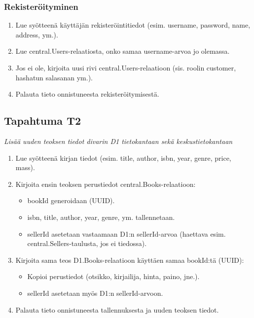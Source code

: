 \documentclass[11pt,a4paper]{article}
\begin{document}
\subsubsection{Rekisteröityminen}

\begin{enumerate}
	\item Lue syötteenä käyttäjän rekisteröintitiedot (esim. username, password, name, address, ym.).
	\item Lue central.Users-relaatiosta, onko samaa username-arvoa jo olemassa.
	\item Jos ei ole, kirjoita uusi rivi central.Users-relaatioon (sis. roolin customer, hashatun salasanan ym.).
	\item Palauta tieto onnistuneesta rekisteröitymisestä.
\end{enumerate}

\subsection{Tapahtuma T2}
{\large{\textit{Lisää uuden teoksen tiedot divarin D1 tietokantaan sekä keskustietokantaan}}}

\begin{enumerate}
	\item Lue syötteenä kirjan tiedot (esim. title, author, isbn, year, genre, price, mass).
	\item Kirjoita ensin teoksen perustiedot central.Books-relaatioon:
	      \begin{itemize}
		      \item bookId generoidaan (UUID).
		      \item isbn, title, author, year, genre, ym. tallennetaan.
		      \item sellerId asetetaan vastaamaan D1:n sellerId-arvoa (haettava esim. central.Sellers-taulusta, jos ei tiedossa).
	      \end{itemize}
	\item Kirjoita sama teos D1.Books-relaatioon käyttäen samaa bookId:tä (UUID):
	      \begin{itemize}
		      \item Kopioi perustiedot (otsikko, kirjailija, hinta, paino, jne.).
		      \item sellerId asetetaan myös D1:n sellerId-arvoon.
	      \end{itemize}
	\item Palauta tieto onnistuneesta tallennuksesta ja uuden teoksen tiedot.
\end{enumerate}
\end{document}
